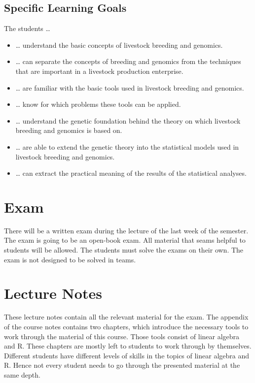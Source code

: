 \documentclass[
]{book}
\providecommand{\tightlist}{%
  \setlength{\itemsep}{0pt}\setlength{\parskip}{0pt}}
\theoremstyle{definition}
\theoremstyle{definition}
\theoremstyle{definition}
\theoremstyle{remark}
\begin{document}
\hypertarget{specific-learning-goals}{%
\subsection*{Specific Learning Goals}\label{specific-learning-goals}}

The students \ldots{}

\begin{itemize}
\tightlist
\item
  \ldots{} understand the basic concepts of livestock breeding and genomics.
\item
  \ldots{} can separate the concepts of breeding and genomics from the techniques that are important in a livestock production enterprise.
\item
  \ldots{} are familiar with the basic tools used in livestock breeding and genomics.
\item
  \ldots{} know for which problems these tools can be applied.
\item
  \ldots{} understand the genetic foundation behind the theory on which livestock breeding and genomics is based on.
\item
  \ldots{} are able to extend the genetic theory into the statistical models used in livestock breeding and genomics.
\item
  \ldots{} can extract the practical meaning of the results of the statistical analyses.
\end{itemize}

\hypertarget{exam}{%
\section*{Exam}\label{exam}}

There will be a written exam during the lecture of the last week of the semester. The exam is going to be an open-book exam. All material that seams helpful to students will be allowed. The students must solve the exams on their own. The exam is not designed to be solved in teams.

\hypertarget{lecture-notes}{%
\section*{Lecture Notes}\label{lecture-notes}}

These lecture notes contain all the relevant material for the exam. The appendix of the course notes contains two chapters, which introduce the necessary tools to work through the material of this course. Those tools consist of linear algebra and R. These chapters are mostly left to students to work through by themselves. Different students have different levels of skills in the topics of linear algebra and R. Hence not every student needs to go through the presented material at the same depth.
\end{document}
